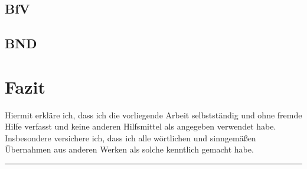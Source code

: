 \documentclass[12pt,a4paper]{scrartcl}
\begin{document}
\subsection{BfV}

\subsection{BND}

\section{Fazit}

\newpage
\printbibliography
\newpage

Hiermit erkläre ich, dass ich die vorliegende Arbeit selbstständig und ohne fremde Hilfe verfasst und keine anderen Hilfsmittel als angegeben verwendet habe. Insbesondere versichere ich, dass ich alle wörtlichen und sinngemäßen Übernahmen aus anderen Werken als solche kenntlich gemacht habe.
\vspace{2cm}
\hrule
\end{document}
